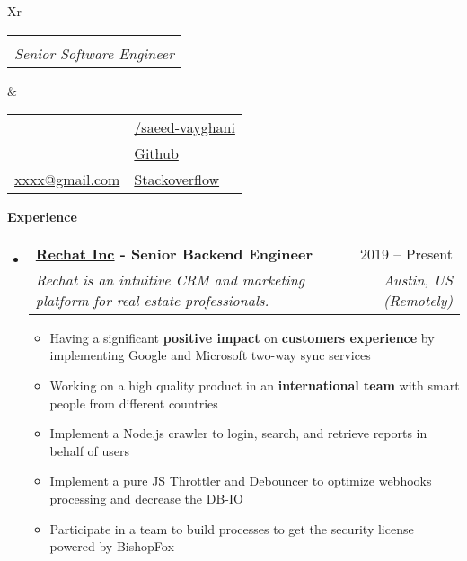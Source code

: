\documentclass[a4paper,12pt]{article}[leftmargin=*]
\makeatletter
\def \fullname {Saeed Vayghani}
\def \subtitle {Senior Software Engineer}
\def \linkedinicon {\faLinkedin}
\def \linkedinlink {https://www.linkedin.com/in/saeed-vayghani-b2866939/}
\def \linkedintext {/saeed-vayghani}
\def \phoneicon {\faPhone}
\def \phonetext {(Iran) +xx-xxxxxxx}
\def \skypeicon {\faSkype}
\def \skypetext {live:xxxxx}
\def \emailicon {\faEnvelope}
\def \emaillink {mailto:xxxx@gmail.com}
\def \emailtext {xxxx@gmail.com}
\def \githubicon {\faGithub}
\def \githublink {https://github.com/saeed-vayghan}
\def \githubtext {Github}
\def \websiteicon {\faStackOverflow}
\def \websitelink {https://stackoverflow.com/users/11074334/saeed}
\def \websitetext {Stackoverflow}
\def \headertype {\doublecol} %
\def \entryspacing {-0pt}
\def \linkedin {\linkedinicon \hspace{3pt}\href{\linkedinlink}{\linkedintext}}
\def \phone {\phoneicon \hspace{3pt}{ \phonetext}}
\def \skype {\skypeicon \hspace{3pt}{\skypetext}}
\def \email {\emailicon \hspace{3pt}\href{\emaillink}{\emailtext}}
\def \github {\githubicon \hspace{3pt}\href{\githublink}{\githubtext}}
\def \website {\websiteicon \hspace{3pt}\href{\websitelink}{\websitetext}}
\renewcommand{\section}[2]{\vspace{5pt}
  \colorbox{secondary}{\color{white}\raggedbottom\normalsize\textbf{{#1}{\hspace{7pt}#2}}}
}
\newcommand{\resumeEntryStart}{\begin{itemize}[leftmargin=2.5mm]}
\newcommand{\resumeEntryEnd}{\end{itemize}\vspace{\entryspacing}}
\newcommand{\resumeItemListStart}{\begin{itemize}[leftmargin=4.5mm]}
\newcommand{\resumeItemListEnd}{\end{itemize}}
\newcommand{\resumeItem}[1]{
  \item\small{
    {#1 \vspace{-2pt}}
  }
}
\newcommand{\resumeEntryTSDL}[4]{
  \vspace{-1pt}\item[]
    \begin{tabularx}{0.99\textwidth}{X@{\hspace{60pt}}r}
      \textbf{\color{primary}#1} & {\firabook\color{accent}\small#2} \\
      \textit{\color{accent}\small#3} & \textit{\color{accent}\small#4} \\
    \end{tabularx}\vspace{-7pt}
}
\newcommand{\doublecol}[6]{
  \begin{tabularx}{\textwidth}{Xr}
    {
      \begin{tabular}[c]{l}
        \fontsize{35}{45}\selectfont{\color{primary}{{\textbf{\fullname}}}} \\
        {\textit{\subtitle}} %
      \end{tabular}
    } & {
      \begin{tabular}[c]{l@{\hspace{1.5em}}l}
        {\small#4} & {\small#1} \\
        {\small#5} & {\small#2} \\
        {\small#6} & {\small#3}
      \end{tabular}
    }
  \end{tabularx}
}
\newcommand{\singlecol}[6]{
  \begin{tabularx}{\textwidth}{Xr}
    {
      \begin{tabular}[b]{l}
        \fontsize{35}{45}\selectfont{\color{primary}{{\textbf{\fullname}}}} \\
        {\textit{\subtitle}} %
      \end{tabular}
    } & {
      \begin{tabular}[c]{l}
        {\small#1} \\
        {\small#2} \\
        {\small#3} \\
        {\small#4} \\
        {\small#5} \\
        {\small#6}
      \end{tabular}
    }
  \end{tabularx}
}
\makeatother
\begin{document}


\headertype{\linkedin}{\github}{\website}{\phone}{\skype}{\email}{} %
\vspace{-5pt} %

\vspace{5pt}
\section{\faPieChart}{Experience}
  \resumeEntryStart
    \vspace{-7pt}
    \resumeEntryTSDL
      {\href{https://rechat.com/}{Rechat Inc} - Senior Backend Engineer}{2019 -- Present}
      {Rechat is an intuitive CRM and marketing platform for real estate professionals.}
      {Austin, US (Remotely)}
    \resumeItemListStart
      \resumeItem {Having a significant \textbf{positive impact} on  \textbf{customers experience} by implementing Google and Microsoft two-way sync services}
      \resumeItem {Working on a high quality product in an \textbf{international team} with smart people from different countries}
      \resumeItem {Implement a Node.js crawler to login, search, and retrieve reports in behalf of users}
      \resumeItem {Implement a pure JS Throttler and Debouncer to optimize webhooks processing and decrease the DB-IO}
      \resumeItem {Participate in a team to build processes to get the security license powered by BishopFox}
    \resumeItemListEnd
  \resumeEntryEnd
  
\end{document}
